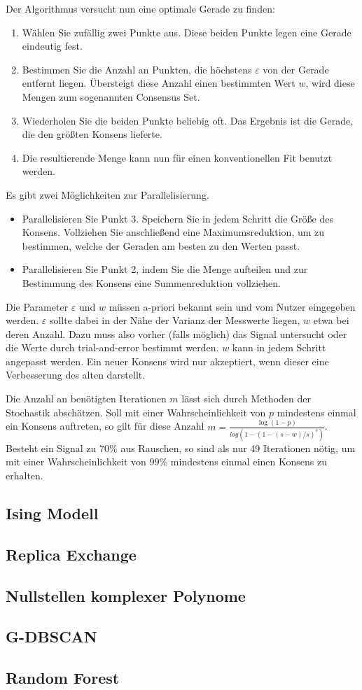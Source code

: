 \documentclass[headsepline=3pt,headinclude=true,12pt,oneside]{scrartcl}
\begin{document}
			Der Algorithmus versucht nun eine optimale Gerade zu finden:
			\begin{enumerate}
				\item Wählen Sie zufällig zwei Punkte aus. Diese beiden Punkte legen eine Gerade eindeutig fest.
				\item Bestimmen Sie die Anzahl an Punkten, die höchstens $\varepsilon$ von der Gerade entfernt liegen. Übersteigt diese Anzahl einen bestimmten Wert $w$, wird diese Mengen zum sogenannten Consensus Set.
				\item Wiederholen Sie die beiden Punkte beliebig oft. Das Ergebnis ist die Gerade, die den größten Konsens lieferte.
				
				\item Die resultierende Menge kann nun für einen konventionellen Fit benutzt werden.
			\end{enumerate}			 
			
			Es gibt zwei Möglichkeiten zur Parallelisierung.
			
			\begin{itemize}
				\item Parallelisieren Sie Punkt 3. Speichern Sie in jedem Schritt die Größe des Konsens. Vollziehen Sie anschließend eine Maximumsreduktion, um zu bestimmen, welche der Geraden am besten zu den Werten passt.
				\item Parallelisieren Sie Punkt 2, indem Sie die Menge aufteilen und zur Bestimmung des Konsens eine Summenreduktion vollziehen. 
			\end{itemize}			 
			
			Die Parameter $\varepsilon$ und $w$ müssen a-priori bekannt sein und vom Nutzer eingegeben werden. $\varepsilon$ sollte dabei in der Nähe der Varianz der Messwerte liegen, $w$ etwa bei deren Anzahl. Dazu muss also vorher (falls möglich) das Signal untersucht oder die Werte durch trial-and-error bestimmt werden. $w$ kann in jedem Schritt angepasst werden. Ein neuer Konsens wird nur akzeptiert, wenn dieser eine Verbesserung des alten darstellt. 
			
			Die Anzahl an benötigten Iterationen $m$ lässt sich durch Methoden der Stochastik abschätzen. Soll mit einer Wahrscheinlichkeit von $p$ mindestens einmal ein Konsens auftreten, so gilt für diese Anzahl $m = \frac{\log(1-p)}{log(1-(1-(s-w)/s)^s)}$. Besteht ein Signal zu $70\%$ aus Rauschen, so sind als nur 49 Iterationen nötig, um mit einer Wahrscheinlichkeit von $99\%$ mindestens einmal einen Konsens zu erhalten.

			\subsection{Ising Modell}
			\subsection{Replica Exchange}
			\subsection{Nullstellen komplexer Polynome}
			\subsection{G-DBSCAN}
			\subsection{Random Forest}
		
\end{document}
